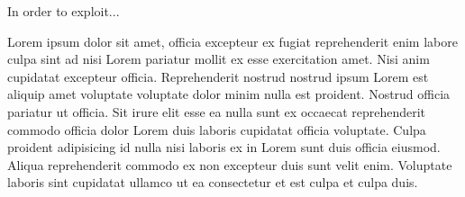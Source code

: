 
\begin{abstract}
  本文……

  \textcolor{blue}{（摘要是一篇具有独立性和完整性的短文，应概括而扼要地反映出本论文的主要内容。包括研究目的、研究方法、研究结果和结论等，特别要突出研究结果和结论。中文摘要力求语言精炼准确，博士学位论文建议1000\textasciitilde{}1200字，硕士学位论文摘要建议500\textasciitilde{}800字。摘要中不可出现参考文献、图、表、化学结构式、非公知公用的符号和术语。英文摘要与中文摘要的内容应完全一致，在语法、用词上应准确无误，语言简练通顺。以外文撰写的学位论文，应以同种语言撰写外文摘要。除外文摘要外，应有中文摘要，置于外文摘要页的后面，并标注中文关键词，为能完整描述学位论文的主要内容，中文摘要宜不少于5000字。）}
\end{abstract}


\begin{abstractEn}
  In order to exploit...

  Lorem ipsum dolor sit amet, officia excepteur ex fugiat reprehenderit enim labore culpa sint ad nisi Lorem pariatur mollit ex esse exercitation amet. Nisi anim cupidatat excepteur officia. Reprehenderit nostrud nostrud ipsum Lorem est aliquip amet voluptate voluptate dolor minim nulla est proident. Nostrud officia pariatur ut officia. Sit irure elit esse ea nulla sunt ex occaecat reprehenderit commodo officia dolor Lorem duis laboris cupidatat officia voluptate. Culpa proident adipisicing id nulla nisi laboris ex in Lorem sunt duis officia eiusmod. Aliqua reprehenderit commodo ex non excepteur duis sunt velit enim. Voluptate laboris sint cupidatat ullamco ut ea consectetur et est culpa et culpa duis.
\end{abstractEn}

